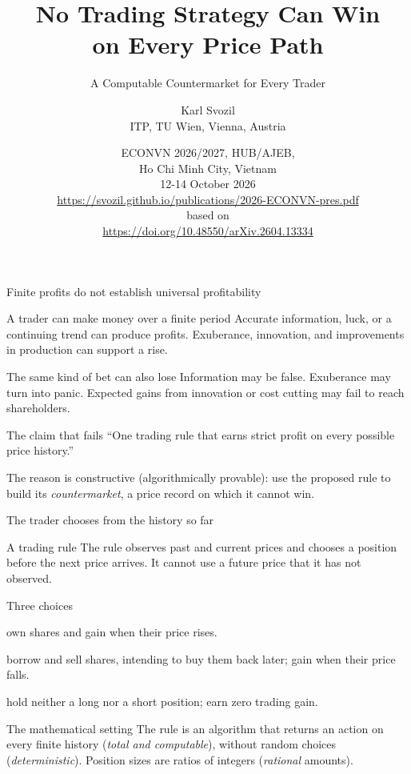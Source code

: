 \documentclass{beamer}
\title{No Trading Strategy Can Win\\on Every Price Path}
\subtitle{A Computable Countermarket for Every Trader}
\author{\texorpdfstring{Karl Svozil\\ITP, TU Wien, Vienna, Austria}%
{Karl Svozil, ITP, TU Wien, Vienna, Austria}}
\date{ECONVN 2026/2027, HUB/AJEB,\\ Ho Chi Minh City, Vietnam\\
12-14 October 2026\\
{\footnotesize \url{https://svozil.github.io/publications/2026-ECONVN-pres.pdf} }
\\
based on
\\
\url{https://doi.org/10.48550/arXiv.2604.13334}
}
\begin{document}
\begin{frame}
\titlepage
\end{frame}

\begin{frame}{Finite profits do not establish universal profitability}
\small
\begin{block}{A trader can make money over a finite period}
Accurate information, luck, or a continuing trend can produce profits.
Exuberance, innovation, and improvements in production can support a rise.
\end{block}
\begin{exampleblock}{The same kind of bet can also lose}
Information may be false. Exuberance may turn into panic.
Expected gains from innovation or cost cutting may fail to reach shareholders.
\end{exampleblock}
\begin{alertblock}{The claim that fails}
\enquote{One trading rule that earns strict profit on every possible
price history.}
\par\medskip
The reason is constructive (algorithmically provable): use the proposed rule to build its
\emph{countermarket}, a price record on which it cannot win.
\end{alertblock}
\end{frame}


\begin{frame}{The trader chooses from the history so far}
\small
\begin{block}{A trading rule}
The rule observes past and current prices and chooses a position before
the next price arrives. It cannot use a future price that it has not observed.
\end{block}
\begin{exampleblock}{Three choices}
\begin{description}
\setlength{\itemsep}{0.55em}
\item[Long:] own shares and gain when their price rises.
\item[Short:] borrow and sell shares, intending to buy them back later;
gain when their price falls.
\item[Wait:] hold neither a long nor a short position; earn zero trading gain.
\end{description}
\end{exampleblock}
\begin{alertblock}{The mathematical setting}
The rule is an algorithm that returns an action on every finite history
(\emph{total and computable}), without random choices (\emph{deterministic}).
Position sizes are ratios of integers (\emph{rational} amounts).
\end{alertblock}
\end{frame}
\end{document}
